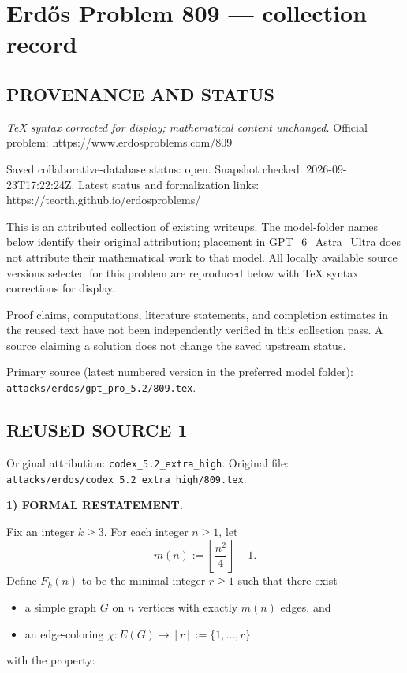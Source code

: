 \section*{Erd\H{o}s Problem 809 --- collection record}

\subsection*{PROVENANCE AND STATUS}

\emph{TeX syntax corrected for display; mathematical content unchanged.}
Official problem: https://www.erdosproblems.com/809

Saved collaborative-database status: open.
Snapshot checked: 2026-09-23T17:22:24Z.
Latest status and formalization links: https://teorth.github.io/erdosproblems/

This is an attributed collection of existing writeups. The model-folder names below identify their original attribution; placement in GPT\_6\_Astra\_Ultra does not attribute their mathematical work to that model. All locally available source versions selected for this problem are reproduced below with TeX syntax corrections for display.

Proof claims, computations, literature statements, and completion estimates in the reused text have not been independently verified in this collection pass. A source claiming a solution does not change the saved upstream status.

Primary source (latest numbered version in the preferred model folder): \texttt{attacks/erdos/gpt\_pro\_5.2/809.tex}.

\subsection*{REUSED SOURCE 1}
Original attribution: \texttt{codex\_5.2\_extra\_high}.
Original file: \texttt{attacks/erdos/codex\_5.2\_extra\_high/809.tex}.

\noindent\textbf{1) FORMAL RESTATEMENT.}

Fix an integer $k\ge 3$. For each integer $n\ge 1$, let
\[
 m(n):=\left\lfloor \frac{n^2}{4}\right\rfloor+1.
\]
Define $F_k(n)$ to be the minimal integer $r\ge 1$ such that there exist
\begin{itemize}
\item a simple graph $G$ on $n$ vertices with exactly $m(n)$ edges, and
\item an edge-coloring $\chi: E(G)\to [r]:=\{1,\dots,r\}$
\end{itemize}
with the property:

